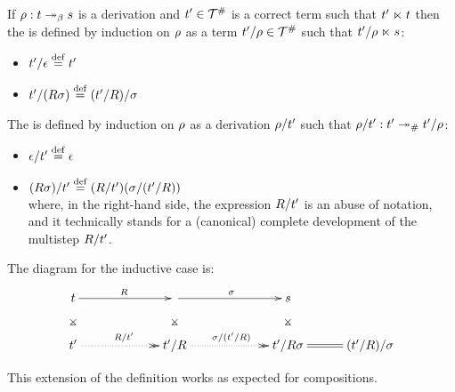 \begin{definition}
If $\rho : t \mathrel{\twoheadrightarrow_\beta} s$ is a derivation and $t' \in \mathcal{T}^{\mathtt{\#}}$ is
a correct term such that $t' \mathrel{\ltimes} t$
then the  is defined
by induction on $\rho$ as a term $t'/\rho \in \mathcal{T}^{\mathtt{\#}}$ such that $t'/\rho \mathrel{\ltimes} s$:
\begin{itemize}
\item $t'/\epsilon \overset{\mathrm{def}}{=} t'$
\item $t'/(R\sigma) \overset{\mathrm{def}}{=} (t'/R)/\sigma$
\end{itemize}
The  is defined
by induction on $\rho$ as a derivation $\rho/t'$ such that $\rho/t' : t' \mathrel{\twoheadrightarrow_{\mathtt{\#}}} t'/\rho$:
\begin{itemize}
\item $\epsilon/t' \overset{\mathrm{def}}{=} \epsilon$
\item $(R\sigma)/t' \overset{\mathrm{def}}{=} (R/t')(\sigma/(t'/R))$ \\
      where, in the right-hand side,
      the expression $R/t'$ is an abuse of notation,
      and it technically stands for
      a (canonical) complete development of the multistep $R/t'$.
\end{itemize}
The diagram for the inductive case is:
\[
\xymatrix@C=1cm{
 \tm \ar@{}[d]|*=0[@]{\rtimes} \ar[rr]^{\redex} && \ar@{}[d]|*=0[@]{\rtimes} \ar[rr]^{\redseqtwo} && \tmtwo \ar@{}[d]|*=0[@]{\rtimes} \\
 \tm' \ar@{.>>}[rr]^{\redex/\tm'} && \tm'/\redex \ar@{.>>}[rr]^{\sigma/(\tm'/\redex)} && \tm'/\redex\redseqtwo \ar@{=}[r] & (\tm'/\redex)/\redseqtwo \\
}
\]
\end{definition}

This extension of the definition works as expected for compositions.

